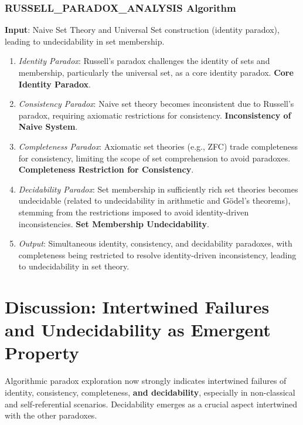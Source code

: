 	\subsubsection{RUSSELL\_PARADOX\_ANALYSIS Algorithm}
	\textbf{Input}: Naive Set Theory and Universal Set construction (identity paradox), leading to undecidability in set membership.
	\begin{enumerate}
		\item \textit{Identity Paradox}: Russell's paradox challenges the identity of sets and membership, particularly the universal set, as a core identity paradox. \textbf{Core Identity Paradox}.
		\item \textit{Consistency Paradox}: Naive set theory becomes inconsistent due to Russell's paradox, requiring axiomatic restrictions for consistency. \textbf{Inconsistency of Naive System}.
		\item \textit{Completeness Paradox}:  Axiomatic set theories (e.g., ZFC) trade completeness for consistency, limiting the scope of set comprehension to avoid paradoxes. \textbf{Completeness Restriction for Consistency}.
		\item \textit{Decidability Paradox}: Set membership in sufficiently rich set theories becomes undecidable (related to undecidability in arithmetic and Gödel's theorems), stemming from the restrictions imposed to avoid identity-driven inconsistencies. \textbf{Set Membership Undecidability}.
		\item \textit{Output}: Simultaneous identity, consistency, and decidability paradoxes, with completeness being restricted to resolve identity-driven inconsistency, leading to undecidability in set theory.
	\end{enumerate}
	
	
	\section{Discussion: Intertwined Failures and Undecidability as Emergent Property}
	
	Algorithmic paradox exploration now strongly indicates intertwined failures of identity, consistency, completeness, \textbf{and decidability}, especially in non-classical and self-referential scenarios.  Decidability emerges as a crucial aspect intertwined with the other paradoxes.
	
